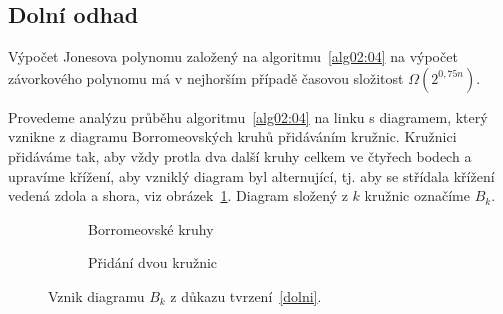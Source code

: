 \subsection{Dolní odhad}

\begin{tvrz} \label{dolni}
Výpočet Jonesova polynomu založený na algoritmu~\ref{alg02:04}  na výpočet závorkového polynomu má v nejhorším případě časovou složitost  $\Omega(2^{0,75 n})$.
\end{tvrz}

\begin{dukaz}
Provedeme analýzu průběhu algoritmu~\ref{alg02:04} na linku s diagramem, který vznikne z diagramu Borromeovských kruhů přidáváním kružnic. Kružnici přidáváme tak, aby vždy protla dva další kruhy celkem ve čtyřech bodech a upravíme křížení, aby vzniklý diagram byl alternující, tj. aby se střídala křížení vedená zdola a shora, viz obrázek~\ref{borro}. Diagram složený z $k$ kružnic označíme $B_k$.

\begin{figure}[h]  

\centering 
\begin{subfigure}[t]{0.4\linewidth}\centering
{} 
\caption{Borromeovské kruhy} 
\end{subfigure}
\begin{subfigure}[t]{0.4\linewidth}\centering
{}
\caption{Přidání dvou kružnic}
\end{subfigure}
\caption{Vznik diagramu $B_k$ z důkazu tvrzení~\ref{dolni}.} \label{borro}
\end{figure}  



\end{dukaz}
